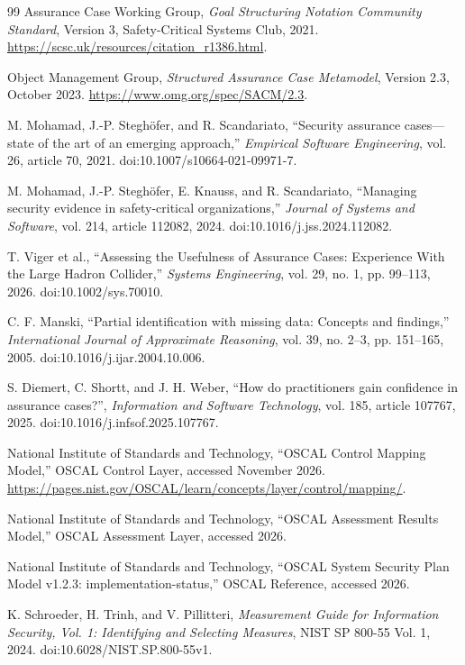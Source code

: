 \documentclass[systems,article,submit,moreauthors]{Definitions/mdpi}
\begin{document}
\begin{thebibliography}{99}
 Assurance Case Working Group, \emph{Goal Structuring Notation Community Standard}, Version 3, Safety-Critical Systems Club, 2021. \url{https://scsc.uk/resources/citation_r1386.html}.

 Object Management Group, \emph{Structured Assurance Case Metamodel}, Version 2.3, October 2023. \url{https://www.omg.org/spec/SACM/2.3}.

 M. Mohamad, J.-P. Stegh\"ofer, and R. Scandariato, ``Security assurance cases---state of the art of an emerging approach,'' \emph{Empirical Software Engineering}, vol. 26, article 70, 2021. doi:10.1007/s10664-021-09971-7.

 M. Mohamad, J.-P. Stegh\"ofer, E. Knauss, and R. Scandariato, ``Managing security evidence in safety-critical organizations,'' \emph{Journal of Systems and Software}, vol. 214, article 112082, 2024. doi:10.1016/j.jss.2024.112082.

 T. Viger et al., ``Assessing the Usefulness of Assurance Cases: Experience With the Large Hadron Collider,'' \emph{Systems Engineering}, vol. 29, no. 1, pp. 99--113, 2026. doi:10.1002/sys.70010.

 C. F. Manski, ``Partial identification with missing data: Concepts and findings,'' \emph{International Journal of Approximate Reasoning}, vol. 39, no. 2--3, pp. 151--165, 2005. doi:10.1016/j.ijar.2004.10.006.

 S. Diemert, C. Shortt, and J. H. Weber, ``How do practitioners gain confidence in assurance cases?'', \emph{Information and Software Technology}, vol. 185, article 107767, 2025. doi:10.1016/j.infsof.2025.107767.

 National Institute of Standards and Technology, ``OSCAL Control Mapping Model,'' OSCAL Control Layer, accessed November 2026. \url{https://pages.nist.gov/OSCAL/learn/concepts/layer/control/mapping/}.

 National Institute of Standards and Technology, ``OSCAL Assessment Results Model,'' OSCAL Assessment Layer, accessed 2026.

 National Institute of Standards and Technology, ``OSCAL System Security Plan Model v1.2.3: implementation-status,'' OSCAL Reference, accessed 2026.

 K. Schroeder, H. Trinh, and V. Pillitteri, \emph{Measurement Guide for Information Security, Vol. 1: Identifying and Selecting Measures}, NIST SP 800-55 Vol. 1, 2024. doi:10.6028/NIST.SP.800-55v1.


\end{thebibliography}
\end{document}
